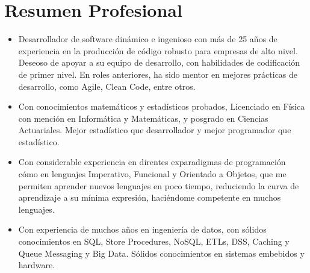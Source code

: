 \section{Resumen Profesional}

\begin{itemize}
    \item Desarrollador de software dinámico e ingenioso con más de 25 años de experiencia en la producción
          de código robusto para empresas de alto nivel. Deseoso de apoyar a su equipo de desarrollo, con
          habilidades de codificación de primer nivel. En roles anteriores, ha sido mentor en mejores prácticas
          de desarrollo, como Agile, Clean Code, entre otros.
    \item Con conocimientos matemáticos y estadísticos probados, Licenciado en Física con mención en Informática
          y Matemáticas, y posgrado en Ciencias Actuariales. Mejor estadístico que desarrollador y mejor
          programador que estadístico.
    \item Con considerable experiencia en direntes exparadigmas de programación cómo en lenguajes Imperativo,
          Funcional y Orientado a Objetos, que me permiten aprender nuevos lenguajes en poco tiempo, reduciendo
          la curva de aprendizaje a su mínima expresión, haciéndome competente en muchos lenguajes.
    \item Con experiencia de muchos años en ingeniería de datos, con sólidos conocimientos en SQL, Store
          Procedures, NoSQL, ETLs, DSS, Caching y Queue Messaging y Big Data.
    \itema Sólidos conocimientos en sistemas embebidos y hardware.
\end{itemize}
